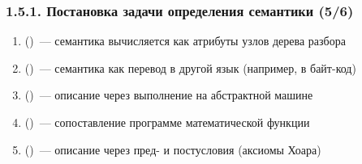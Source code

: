 \begin{frame}
\frametitle{1.5.1. Постановка задачи определения семантики (5/6)}


\begin{enumerate}
\item {} ()~--- 
семантика вычисляется как атрибуты узлов дерева разбора

\item {} ()~--- 
семантика как перевод в другой язык (например, в байт-код)

\item {} ()~--- 
описание через выполнение на абстрактной машине

\item {} ()~--- 
сопоставление программе математической функции

\item {} ()~--- 
описание через пред- и постусловия (аксиомы Хоара)
\end{enumerate}

\end{frame}


